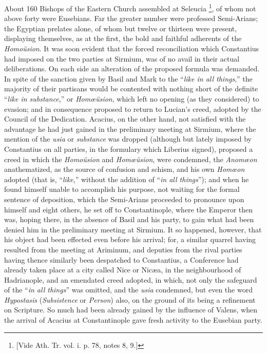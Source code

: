 About 160 Bishops of the Eastern Church assembled at Seleucia \footnote{[Vide Ath. Tr. vol. i. p. 78, notes 8, 9.]}, of whom not above forty were Eusebians. Far the greater number
were professed Semi-Arians; the Egyptian prelates alone, of whom but
twelve or thirteen were present, displaying themselves, as at the
first, the bold and faithful adherents of the \emph{Homoüsion}. It
was soon evident that the forced reconciliation which
Constantius had imposed on the two parties at Sirmium, was of no avail
in their actual deliberations. On each side an alteration of the
proposed formula was demanded. In spite of the sanction given by Basil
and Mark to the ``\emph{like in all things},'' the majority of
their partisans would be contented with nothing short of the definite
``\emph{like in substance},'' or \emph{Homœüsion}, which
left no opening (as they considered) to evasion; and in consequence
proposed to return to Lucian's creed, adopted by the Council of the
Dedication. Acacius, on the other hand, not satisfied with the
advantage he had just gained in the preliminary meeting at Sirmium,
where the mention of the \emph{usia} or \emph{substance} was dropped
(although but lately imposed by Constantius on all parties, in the
formulary which Liberius signed), proposed a creed in which the \emph{Homoüsion}
and \emph{Homœüsion}, were condemned, the \emph{Anomœon}
anathematized, as the source of confusion and schism, and his own \emph{Homœon}
adopted (that is, ``\emph{like},'' without the addition of
``\emph{in all things}''); and when he found himself unable to
accomplish his purpose, not waiting for the formal sentence of
deposition, which the Semi-Arians proceeded to pronounce upon himself
and eight others, he set off to Constantinople, where the Emperor then
was, hoping there, in the absence of Basil and his party, to gain what
had been denied him in the preliminary meeting at Sirmium. It so
happened, however, that his object had been effected even before his
arrival; for, a similar quarrel having resulted from the meeting at
Ariminum, and deputies from the rival parties having thence similarly
been despatched to Constantius, a Conference had already taken place
at a city called Nice or Nicæa, in the neighbourhood of
Hadrianople, and an emendated creed adopted, in which, not only the
safeguard of the ``\emph{in all things}'' was omitted, and the
\emph{usia} condemned, but even the word \emph{Hypostasis} (\emph{Subsistence}
or \emph{Person}) also, on the ground of its being a refinement on
Scripture. So much had been already gained by the influence of Valens,
when the arrival of Acacius at Constantinople gave fresh activity to
the Eusebian party.

